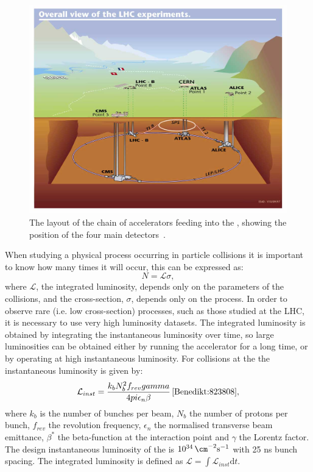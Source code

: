 \begin{figure}
  \includegraphics[width=\largefigwidth]{plots/detector/lhc_layout_sch.jpg}
  \caption[The layout of the chain of accelerators feeding into the \LHC, showing the position of the four main detectors.]{The layout of the chain of accelerators feeding into the \LHC, showing the position of the four main detectors~\cite{lhcexpschematic}.}
  \label{fig:lhclayout}
\end{figure}

When studying a physical process occurring in particle collisions it is important to know how many times it will occur, this can be expressed as:
\begin{equation}
  N = \mathcal{L}\sigma,
\end{equation}
where $\mathcal{L}$, the integrated luminosity, depends only on the parameters of the collisions, and the cross-section, $\sigma$, depends only on the process. In order to observe rare (i.e. low cross-section) processes, such as those studied at the LHC, it is necessary to use very high luminosity datasets. The integrated luminosity is obtained by integrating the instantaneous luminosity over time, so large luminosities can be obtained either by running the accelerator for a long time, or by operating at high instantaneous luminosity. For collisions at the \LHC the instantaneous luminosity is given by:
\begin{equation}
  \mathcal{L}_{inst}=\frac{k_{b}N_{b}^{2}f_{rev}\gamma}{4\pi\epsilon_{n}\beta}\,\cite{Benedikt:823808},
\end{equation}
where $k_{b}$ is the number of bunches per beam, $N_{b}$ the number of protons per bunch, $f_{rev}$ the revolution frequency, $\epsilon_{n}$ the normalised transverse beam emittance, $\beta^{*}$ the beta-function at the interaction point and $\gamma$ the Lorentz factor. The design instantaneous luminosity of the \LHC is $10^{34}\,\cm^{-2}\rm{s}^{-1}$ with 25 ns bunch spacing. The integrated luminosity is defined as $\mathcal{L}=\int\mathcal{L}_{inst}\mathrm{d}t$.


